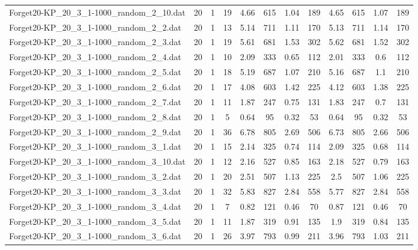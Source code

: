 \begin{sidewaystable}[!ht]
{\begin{tabular}{lccccccccccc}
Forget20-KP\_20\_3\_1-1000\_random\_2\_10.dat & 20 & 1 & 19 & 4.66 & 615 &  \textcolor{blue2}{1.04} & 189 & 4.65 & 615 & 1.07 & 189 \\
Forget20-KP\_20\_3\_1-1000\_random\_2\_2.dat & 20 & 1 & 13 & 5.14 & 711 & 1.11 & 170 & 5.13 & 711 & 1.14 & 170 \\
Forget20-KP\_20\_3\_1-1000\_random\_2\_3.dat & 20 & 1 & 19 & 5.61 & 681 & 1.53 & 302 & 5.62 & 681 & 1.52 & 302 \\
Forget20-KP\_20\_3\_1-1000\_random\_2\_4.dat & 20 & 1 & 10 & 2.09 & 333 & 0.65 & 112 & 2.01 & 333 &  \textcolor{blue2}{0.6} & 112 \\
Forget20-KP\_20\_3\_1-1000\_random\_2\_5.dat & 20 & 1 & 18 & 5.19 & 687 & 1.07 & 210 & 5.16 & 687 & 1.1 & 210 \\
Forget20-KP\_20\_3\_1-1000\_random\_2\_6.dat & 20 & 1 & 17 & 4.08 & 603 & 1.42 & 225 & 4.12 & 603 & 1.38 & 225 \\
Forget20-KP\_20\_3\_1-1000\_random\_2\_7.dat & 20 & 1 & 11 & 1.87 & 247 & 0.75 & 131 & 1.83 & 247 &  \textcolor{blue2}{0.7} & 131 \\
Forget20-KP\_20\_3\_1-1000\_random\_2\_8.dat & 20 & 1 & 5 & 0.64 & 95 &  \textcolor{blue2}{0.32} & 53 & 0.64 & 95 &  \textcolor{blue2}{0.32} & 53 \\
Forget20-KP\_20\_3\_1-1000\_random\_2\_9.dat & 20 & 1 & 36 & 6.78 & 805 & 2.69 & 506 & 6.73 & 805 &  \textcolor{blue2}{2.66} & 506 \\
Forget20-KP\_20\_3\_1-1000\_random\_3\_1.dat & 20 & 1 & 15 & 2.14 & 325 & 0.74 & 114 & 2.09 & 325 &  \textcolor{blue2}{0.68} & 114 \\
Forget20-KP\_20\_3\_1-1000\_random\_3\_10.dat & 20 & 1 & 12 & 2.16 & 527 & 0.85 & 163 & 2.18 & 527 &  \textcolor{blue2}{0.79} & 163 \\
Forget20-KP\_20\_3\_1-1000\_random\_3\_2.dat & 20 & 1 & 20 & 2.51 & 507 & 1.13 & 225 & 2.5 & 507 &  \textcolor{blue2}{1.06} & 225 \\
Forget20-KP\_20\_3\_1-1000\_random\_3\_3.dat & 20 & 1 & 32 & 5.83 & 827 &  \textcolor{blue2}{2.84} & 558 & 5.77 & 827 &  \textcolor{blue2}{2.84} & 558 \\
Forget20-KP\_20\_3\_1-1000\_random\_3\_4.dat & 20 & 1 & 7 & 0.82 & 121 & 0.46 & 70 & 0.87 & 121 & 0.46 & 70 \\
Forget20-KP\_20\_3\_1-1000\_random\_3\_5.dat & 20 & 1 & 11 & 1.87 & 319 & 0.91 & 135 & 1.9 & 319 & 0.84 & 135 \\
Forget20-KP\_20\_3\_1-1000\_random\_3\_6.dat & 20 & 1 & 26 & 3.97 & 793 &  \textcolor{blue2}{0.99} & 211 & 3.96 & 793 & 1.03 & 211 \\

\end{tabular}}
\end{sidewaystable}
